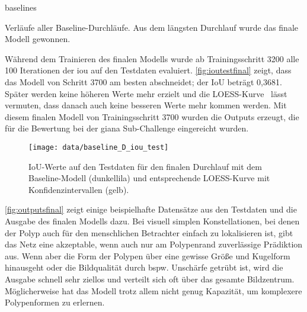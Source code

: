\begin{losses}{baselines}
	\caption[Verläufe aller Baseline-Durchläufe]{Verläufe aller Baseline-Durchläufe. Aus dem längsten Durchlauf wurde das finale Modell gewonnen.}
	\label{fig:lossbaselineAtoD}
\end{losses}

Während dem Trainieren des finalen Modells wurde ab Trainingsschritt 3200 alle 100 Iterationen der \gls{iou} auf den Testdaten evaluiert.
\autoref{fig:ioutestfinal} zeigt, dass das Modell von Schritt 3700 am besten abschneidet; der IoU beträgt 0,3681.
Später werden keine höheren Werte mehr erzielt und die LOESS-Kurve~\cite{Cleveland.1992} lässt vermuten, dass danach auch keine besseren Werte mehr kommen werden.
Mit diesem finalen Modell von Trainingsschritt 3700 wurden die Outputs erzeugt, die für die Bewertung bei der \gls{giana} Sub-Challenge eingereicht wurden.

\begin{figure}
	\centering
	\texttt{[image: data/baseline\_D\_iou\_test]}
	\caption[IoU-Werte auf den Testdaten für den finalen Durchlauf mit dem Baseline-Modell und entsprechende LOESS-Kurve mit Konfidenzintervallen]{IoU-Werte auf den Testdaten für den finalen Durchlauf mit dem Baseline-Modell (dunkellila) und entsprechende LOESS-Kurve mit Konfidenzintervallen (gelb).}
	\label{fig:ioutestfinal}
\end{figure}

\autoref{fig:outputsfinal} zeigt einige beispielhafte Datensätze aus den Testdaten und die Ausgabe des finalen Modells dazu.
Bei visuell simplen Konstellationen, bei denen der Polyp auch für den menschlichen Betrachter einfach zu lokalisieren ist, gibt das Netz eine akzeptable, wenn auch nur am Polypenrand zuverlässige Prädiktion aus.
Wenn aber die Form der Polypen über eine gewisse Größe und Kugelform hinausgeht oder die Bildqualität durch bspw. Unschärfe getrübt ist, wird die Ausgabe schnell sehr ziellos und verteilt sich oft über das gesamte Bildzentrum.
Möglicherweise hat das Modell trotz allem nicht genug Kapazität, um komplexere Polypenformen zu erlernen.

